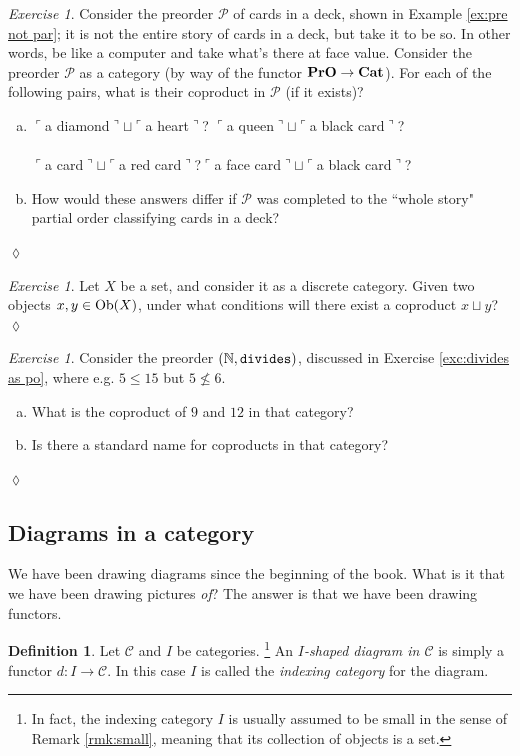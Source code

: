 \documentclass{book}
\def\tn{\textnormal}
\def\mc{\mathcal}
\def\NN{{\mathbb N}}
\def\Ob{\tn{Ob}}
\def\to{\rightarrow}
\def\taking{\colon}
\newcommand{\fakebox}[1]{\tn{$\ulcorner$#1$\urcorner$}}
\def\Cat{{\bf Cat}}
\def\PrO{{\bf PrO}}
\def\mcC{\mc{C}}
\def\mcP{\mc{P}}
\theoremstyle{remark}
\newtheorem{exc}[subsubsection]{Exercise}
\newenvironment{exercise}{\begin{exc}}{\hspace*{\fill}$\lozenge$\end{exc}}
\theoremstyle{definition}
\newtheorem{definition}[subsubsection]{Definition}
\def\sexc{\begin{enumerate}[a.)]\setlength{\itemsep}{.1cm}\setlength{\parskip}{.1cm}\item}
\def\next{\item}
\def\endsexc{\end{enumerate}}
\begin{document}
\begin{exercise}
Consider the preorder $\mcP$ of cards in a deck, shown in Example \ref{ex:pre not par}; it is not the entire story of cards in a deck, but take it to be so. In other words, be like a computer and take what's there at face value. Consider the preorder $\mcP$ as a category (by way of the functor $\PrO\to\Cat$). For each of the following pairs, what is their coproduct in $\mcP$ (if it exists)?
\sexc 
\begin{tabbing}
\hspace{.5in}\= \fakebox{a diamond}$\sqcup$\fakebox{a heart}\;?\hspace{.5in} \=\fakebox{a queen}$\sqcup$\fakebox{a black card}\;?\\\\
\> \fakebox{a card}$\sqcup$\fakebox{a red card}\;?\>\fakebox{a face card}$\sqcup$\fakebox{a black card}\;?
\end{tabbing}
\next How would these answers differ if $\mcP$ was completed to the ``whole story" partial order classifying cards in a deck?
\endsexc
\end{exercise}

\begin{exercise}
Let $X$ be a set, and consider it as a discrete category. Given two objects $x,y\in\Ob(X)$, under what conditions will there exist a coproduct $x\sqcup y$?
\end{exercise}

\begin{exercise}
Consider the preorder $(\NN,{\tt divides})$, discussed in Exercise \ref{exc:divides as po}, where e.g. $5\leq 15$ but $5\not\leq 6$. \sexc What is the coproduct of $9$ and $12$ in that category?
\next Is there a standard name for coproducts in that category?
\endsexc
\end{exercise}


\subsection{Diagrams in a category}\label{sec:diagrams in a category}

We have been drawing diagrams since the beginning of the book. What is it that we have been drawing pictures {\em of}? The answer is that we have been drawing functors.

\begin{definition}

Let $\mcC$ and $I$ be categories.
\footnote{In fact, the indexing category $I$ is usually assumed to be small in the sense of Remark \ref{rmk:small}, meaning that its collection of objects is a set.}
An {\em $I$-shaped diagram in $\mcC$} is simply a functor $d\taking I\to\mcC$. In this case $I$ is called the {\em indexing category} for the diagram.

\end{definition}
\end{document}
